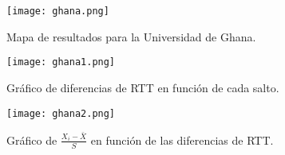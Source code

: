 \begin{figure}[H]
\texttt{[image: ghana.png]}
\caption{Mapa de resultados para la Universidad de Ghana.}
\label{mapa2}
\end{figure}

\begin{figure}[H]
\centering
\texttt{[image: ghana1.png]}
\caption{Gráfico de diferencias de RTT en función de cada salto.}
\label{diff2}
\end{figure}

\begin{figure}[H]
\centering
\texttt{[image: ghana2.png]}
\caption{Gráfico de $\frac{X_i - \bar{X}}{S}$ en función de las diferencias de RTT.}
\label{sdev2}
\end{figure}